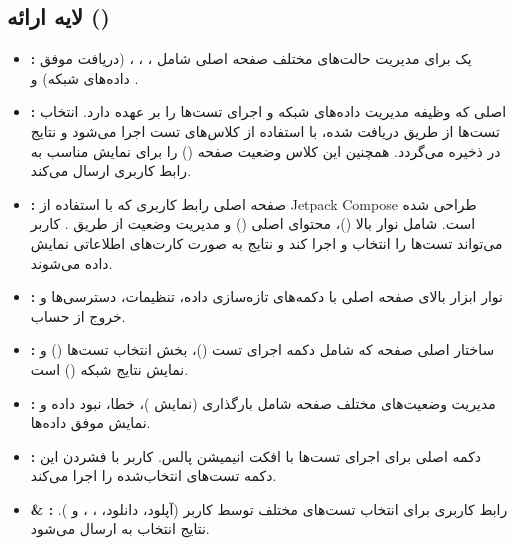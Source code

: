 \subsection{لایه ارائه ()}
\begin{itemize}
    \item \textbf{:}  
    یک  برای مدیریت حالت‌های مختلف صفحه اصلی شامل ، ، ،  (دریافت موفق داده‌های شبکه) و .
    
    \item \textbf{:}  
     اصلی که وظیفه مدیریت داده‌های شبکه و اجرای تست‌ها را بر عهده دارد. انتخاب تست‌ها از طریق  دریافت شده، با استفاده از کلاس‌های تست اجرا می‌شود و نتایج در  ذخیره می‌گردد. همچنین این کلاس وضعیت صفحه () را برای نمایش مناسب به رابط کاربری ارسال می‌کند.
    
    \item \textbf{:}  
    صفحه اصلی رابط کاربری که با استفاده از Jetpack Compose طراحی شده است. شامل نوار بالا ()، محتوای اصلی () و مدیریت وضعیت از طریق . کاربر می‌تواند تست‌ها را انتخاب و اجرا کند و نتایج به صورت کارت‌های اطلاعاتی نمایش داده می‌شوند.
    
    \item \textbf{:}  
    نوار ابزار بالای صفحه اصلی با دکمه‌های تازه‌سازی داده، تنظیمات، دسترسی‌ها و خروج از حساب.
    
    \item \textbf{:}  
    ساختار اصلی صفحه که شامل دکمه اجرای تست ()، بخش انتخاب تست‌ها () و نمایش نتایج شبکه () است.
    
    \item \textbf{:}  
    مدیریت وضعیت‌های مختلف صفحه شامل بارگذاری (نمایش )، خطا، نبود داده و نمایش موفق داده‌ها.
    
    \item \textbf{:}  
    دکمه اصلی برای اجرای تست‌ها با افکت انیمیشن پالس. کاربر با فشردن این دکمه تست‌های انتخاب‌شده را اجرا می‌کند.
    
    \item \textbf{ \& :}  
    رابط کاربری برای انتخاب تست‌های مختلف توسط کاربر (آپلود، دانلود، ، ،  و ). نتایج انتخاب به  ارسال می‌شود.
    

\end{itemize}
